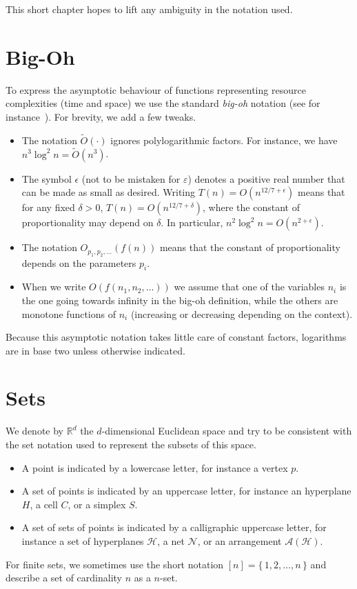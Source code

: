 
This short chapter hopes to lift any ambiguity in the notation used.

\section*{Big-Oh}

To express the asymptotic behaviour of functions representing resource
complexities (time and space) we use the standard \emph{big-oh} notation
(see for instance~\cite[Chapter~3]{CLRS09}). For brevity, we add a few
tweaks.

\begin{itemize}

\item The notation $\tilde{O}(\cdot)$ ignores polylogarithmic factors. For
	instance, we have
	\(n^3 \log^2 n = \tilde{O}(n^3)\).

\item The symbol $\epsilon$ (not to be mistaken for \(\varepsilon\))
	denotes a positive real number that can be made as small as desired.
	Writing \(T(n) = O(n^{12/7 + \epsilon})\) means that for any fixed
	\(\delta > 0\), \(T(n) = O(n^{12/7 + \delta})\), where the constant of
	proportionality may depend on \(\delta\).
	In particular, \(n^2 \log^2 n = O(n^{2 + \epsilon})\).

\item The notation \(O_{p_1,p_2, \ldots}(f(n))\) means that the constant of
	proportionality depends on the parameters \(p_i\).

\item When we write \(O(f(n_1,n_2, \ldots))\) we assume that one of the variables
	\(n_i\) is the one going towards infinity in the big-oh definition, while the
	others are monotone functions of \(n_i\) (increasing or decreasing
	depending on the context).

\end{itemize}

Because this asymptotic notation takes little care of constant factors,
logarithms are in base two unless otherwise indicated.

\section*{Sets}

We denote by \(\mathbb{R}^d\) the \(d\)-dimensional Euclidean space
and try to be consistent with the set notation used to represent the subsets
of this space.
\begin{itemize}
	\item A point is indicated by a lowercase letter, for instance a vertex \(p\).
	\item A set of points is indicated by an uppercase letter, for instance an
		hyperplane \(H\), a cell \(C\), or a simplex \(S\).
	\item A set of sets of points is indicated by a calligraphic uppercase
		letter, for instance
		a set of hyperplanes \(\mathcal{H}\),
		a net \(\mathcal{N}\), or an arrangement \(\mathcal{A}(\mathcal{H})\).
\end{itemize}

For finite sets,
we sometimes use the short notation \([n] = \{\,1,2,\ldots ,n\,\}\) and
describe a set of cardinality \(n\) as a \(n\)-set.

